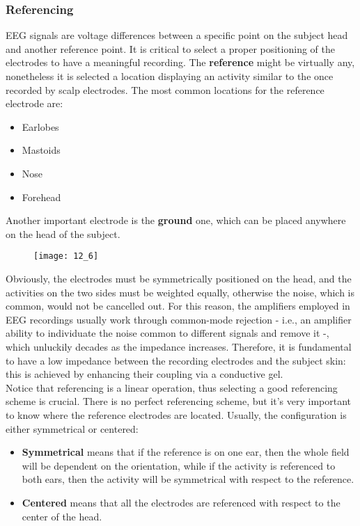 \subsubsection{Referencing}
EEG signals are voltage differences between a specific point on the subject head and another
reference point. It is critical to select a proper positioning of the electrodes to have a
meaningful recording. The \textbf{reference} might be virtually any, nonetheless it is selected a
location displaying an activity similar to the once recorded by scalp electrodes.
The most common locations for the reference electrode are:
\begin{itemize}
    \item Earlobes
    \item Mastoids
    \item Nose
    \item Forehead
\end{itemize}
Another important electrode is the \textbf{ground} one, which can be placed anywhere on the head of the
subject.
\begin{figure}[H]
    \centering
    \texttt{[image: 12\_6]}
\end{figure}
Obviously, the electrodes must be symmetrically positioned on the head, and the activities on the two sides
must be weighted equally, otherwise the noise, which is common, would not be cancelled out.
For this reason, the amplifiers employed in EEG recordings usually work through common-mode rejection
- i.e., an amplifier ability to individuate the noise common to different signals and remove
it -, which unluckily decades as the impedance increases. Therefore, it is fundamental to
have a low impedance between the recording electrodes and the subject skin: this is achieved
by enhancing their coupling via a conductive gel.\\
Notice that referencing is a linear operation, thus selecting a good referencing scheme is
crucial. There is no perfect referencing scheme, but it's very important to know where the reference electrodes
are located. Usually, the configuration is either symmetrical or centered:
\begin{itemize}
    \item \textbf{Symmetrical} means that if the reference is on one ear, then the whole field will be dependent
          on the orientation, while if the activity is referenced to both ears, then the activity will be symmetrical
          with respect to the reference.
    \item \textbf{Centered} means that all the electrodes are referenced with respect to the center of the head.
\end{itemize}
